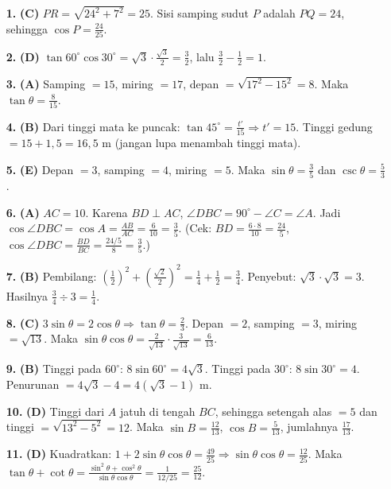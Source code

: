 \documentclass[a4paper,11pt]{article}
\newcommand{\dis}{\displaystyle}
\begin{document}
\small\begin{enumerate}[leftmargin=2em,itemsep=2pt,topsep=2pt]
\item[\textbf{1.}] \textbf{(C)} $PR=\sqrt{24^{2}+7^{2}}=25$. Sisi samping sudut $P$ adalah $PQ=24$, sehingga $\cos P=\dis\frac{24}{25}$.
\item[\textbf{2.}] \textbf{(D)} $\tan60^\circ\cos30^\circ=\sqrt3\cdot\dis\frac{\sqrt3}{2}=\dis\frac32$, lalu $\dis\frac32-\dis\frac12=1$.
\item[\textbf{3.}] \textbf{(A)} Samping $=15$, miring $=17$, depan $=\sqrt{17^{2}-15^{2}}=8$. Maka $\tan\theta=\dis\frac{8}{15}$.
\item[\textbf{4.}] \textbf{(B)} Dari tinggi mata ke puncak: $\tan45^\circ=\dis\frac{t'}{15}\Rightarrow t'=15$. Tinggi gedung $=15+1{,}5=16{,}5$ m (jangan lupa menambah tinggi mata).
\item[\textbf{5.}] \textbf{(E)} Depan $=3$, samping $=4$, miring $=5$. Maka $\sin\theta=\dis\frac35$ dan $\csc\theta=\dis\frac53$.
\item[\textbf{6.}] \textbf{(A)} $AC=10$. Karena $BD\perp AC$, $\angle DBC=90^\circ-\angle C=\angle A$. Jadi $\cos\angle DBC=\cos A=\dis\frac{AB}{AC}=\dis\frac{6}{10}=\dis\frac35$. (Cek: $BD=\dis\frac{6\cdot8}{10}=\dis\frac{24}{5}$, $\cos\angle DBC=\dis\frac{BD}{BC}=\dis\frac{24/5}{8}=\dis\frac35$.)
\item[\textbf{7.}] \textbf{(B)} Pembilang: $\left(\dis\frac12\right)^{2}+\left(\dis\frac{\sqrt2}{2}\right)^{2}=\dis\frac14+\dis\frac12=\dis\frac34$. Penyebut: $\sqrt3\cdot\sqrt3=3$. Hasilnya $\dis\frac34\div3=\dis\frac14$.
\item[\textbf{8.}] \textbf{(C)} $3\sin\theta=2\cos\theta\Rightarrow\tan\theta=\dis\frac23$. Depan $=2$, samping $=3$, miring $=\sqrt{13}$. Maka $\sin\theta\cos\theta=\dis\frac{2}{\sqrt{13}}\cdot\dis\frac{3}{\sqrt{13}}=\dis\frac{6}{13}$.
\item[\textbf{9.}] \textbf{(B)} Tinggi pada $60^\circ$: $8\sin60^\circ=4\sqrt3$. Tinggi pada $30^\circ$: $8\sin30^\circ=4$. Penurunan $=4\sqrt3-4=4\left(\sqrt3-1\right)$ m.
\item[\textbf{10.}] \textbf{(D)} Tinggi dari $A$ jatuh di tengah $BC$, sehingga setengah alas $=5$ dan tinggi $=\sqrt{13^{2}-5^{2}}=12$. Maka $\sin B=\dis\frac{12}{13}$, $\cos B=\dis\frac{5}{13}$, jumlahnya $\dis\frac{17}{13}$.
\item[\textbf{11.}] \textbf{(D)} Kuadratkan: $1+2\sin\theta\cos\theta=\dis\frac{49}{25}\Rightarrow\sin\theta\cos\theta=\dis\frac{12}{25}$. Maka $\tan\theta+\cot\theta=\dis\frac{\sin^{2}\theta+\cos^{2}\theta}{\sin\theta\cos\theta}=\dis\frac{1}{12/25}=\dis\frac{25}{12}$.

\end{enumerate}
\end{document}
